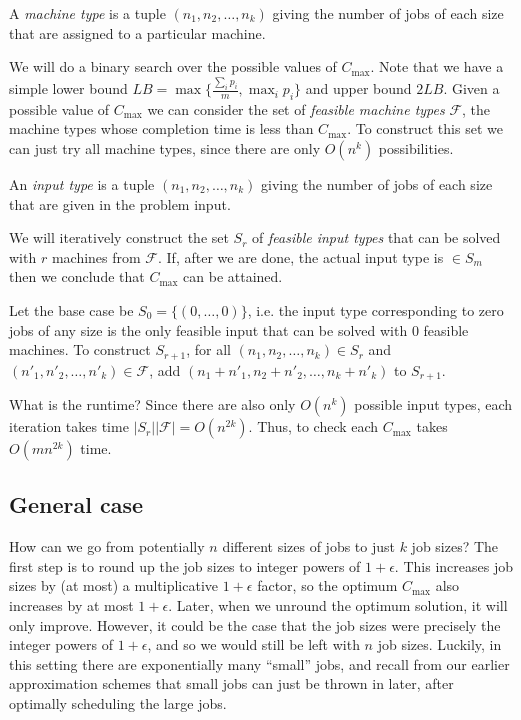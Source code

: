 \documentclass{article}
\begin{document}
\begin{definition}
A {\em machine type} is a tuple $(n_1, n_2, \ldots, n_k)$ giving the
number of jobs of each size that are assigned to a particular machine.
\end{definition}

We will do a binary search over the possible values of
$C_{\textrm{max}}$. Note that we have a simple lower bound $LB
=\max\{\frac{\sum_i{p_i}}{m}, \max_i{p_i}\}$ and upper bound $2
LB$. Given a possible value of $C_{\textrm{max}}$ we can consider the
set of {\em feasible machine types} $\mathcal{F}$, the machine types
whose completion time is less than $C_{\textrm{max}}$. To construct
this set we can just try all machine types, since there are only
$O(n^k)$ possibilities.

\begin{definition}
An {\em input type} is a tuple $(n_1, n_2, \ldots, n_k)$ giving the
number of jobs of each size that are given in the problem input.
\end{definition}

We will iteratively construct the set $S_r$ of {\em feasible input
types} that can be solved with $r$ machines from $\mathcal{F}$. If, after
we are done, the actual input type is $\in S_m$ then we conclude that
$C_{\textrm{max}}$ can be attained.

Let the base case be $S_0=\{(0,\ldots,0)\}$, i.e. the input type
corresponding to zero jobs of any size is the only feasible input that
can be solved with 0 feasible machines. To construct $S_{r+1}$, for
all $(n_1, n_2, \ldots, n_k) \in S_r$ and $(n'_1, n'_2, \ldots,
n'_k) \in \mathcal{F}$, add $(n_1+n'_1,n_2+n'_2, \ldots, n_k+n'_k)$
to $S_{r+1}$.

What is the runtime? Since there are also only $O(n^k)$ possible input
types, each iteration takes time $|S_r||\mathcal{F}| =
O(n^{2k})$. Thus, to check each $C_{\textrm{max}}$ takes $O(mn^{2k})$
time.


\subsection{General case}

How can we go from potentially $n$ different sizes of jobs to just $k$
job sizes? The first step is to round up the job sizes to integer
powers of $1+\epsilon$. This increases job sizes by (at most) a
multiplicative $1+\epsilon$ factor, so the optimum $C_{\textrm{max}}$
also increases by at most $1+\epsilon$. Later, when we unround the
optimum solution, it will only improve. However, it could be the case
that the job sizes were precisely the integer powers of $1+\epsilon$,
and so we would still be left with $n$ job sizes. Luckily, in this
setting there are exponentially many ``small'' jobs, and recall from
our earlier approximation schemes that small jobs can just be thrown
in later, after optimally scheduling the large jobs.
\end{document}
